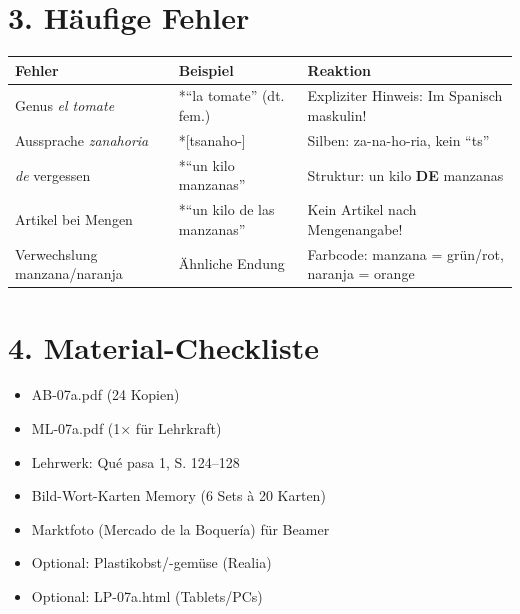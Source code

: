 \documentclass[11pt, a4paper]{article}
\begin{document}
\section*{3. Häufige Fehler}

\begin{fehlerbox}
\begin{tabularx}{\textwidth}{|l|X|X|}
\hline
\textbf{Fehler} & \textbf{Beispiel} & \textbf{Reaktion} \\
\hline
Genus \textit{el tomate} & *``la tomate'' (dt. fem.) & Expliziter Hinweis: Im Spanisch maskulin! \\
\hline
Aussprache \textit{zanahoria} & *[tsanaho-] & Silben: za-na-ho-ria, kein ``ts'' \\
\hline
\textit{de} vergessen & *``un kilo manzanas'' & Struktur: un kilo \textbf{DE} manzanas \\
\hline
Artikel bei Mengen & *``un kilo de las manzanas'' & Kein Artikel nach Mengenangabe! \\
\hline
Verwechslung manzana/naranja & Ähnliche Endung & Farbcode: manzana = grün/rot, naranja = orange \\
\hline
\end{tabularx}
\end{fehlerbox}


\section*{4. Material-Checkliste}

\begin{materialbox}
\begin{itemize}[label=$\square$]
    \item AB-07a.pdf (24 Kopien)
    \item ML-07a.pdf (1× für Lehrkraft)
    \item Lehrwerk: Qué pasa 1, S. 124--128
    \item Bild-Wort-Karten Memory (6 Sets à 20 Karten)
    \item Marktfoto (Mercado de la Boquería) für Beamer
    \item Optional: Plastikobst/-gemüse (Realia)
    \item Optional: LP-07a.html (Tablets/PCs)
\end{itemize}
\end{materialbox}
\end{document}
